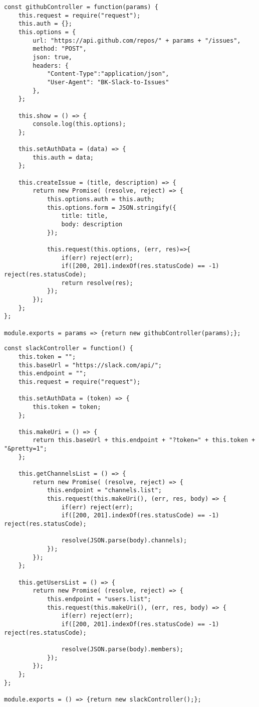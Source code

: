 \begin{verbatim}
const githubController = function(params) {
	this.request = require("request");
	this.auth = {};
	this.options = {
		url: "https://api.github.com/repos/" + params + "/issues",
		method: "POST",
		json: true,
		headers: {
			"Content-Type":"application/json",
			"User-Agent": "BK-Slack-to-Issues"
		},
	};

	this.show = () => {
		console.log(this.options);
	};

	this.setAuthData = (data) => {
		this.auth = data;
	};

	this.createIssue = (title, description) => {
		return new Promise( (resolve, reject) => {
			this.options.auth = this.auth;
			this.options.form = JSON.stringify({
				title: title,
				body: description
			});

			this.request(this.options, (err, res)=>{
				if(err) reject(err);
				if([200, 201].indexOf(res.statusCode) == -1) reject(res.statusCode);
				return resolve(res);
			});
		});
	};
};

module.exports = params => {return new githubController(params);};

\end{verbatim}

\begin{verbatim}
const slackController = function() {
	this.token = "";
	this.baseUrl = "https://slack.com/api/";
	this.endpoint = "";
	this.request = require("request");

	this.setAuthData = (token) => {
		this.token = token;
	};

	this.makeUri = () => {
		return this.baseUrl + this.endpoint + "?token=" + this.token + "&pretty=1";
	};

	this.getChannelsList = () => {
		return new Promise( (resolve, reject) => {
			this.endpoint = "channels.list";
			this.request(this.makeUri(), (err, res, body) => {
				if(err) reject(err);
				if([200, 201].indexOf(res.statusCode) == -1) reject(res.statusCode);

				resolve(JSON.parse(body).channels);
			});
		});
	};

	this.getUsersList = () => {
		return new Promise( (resolve, reject) => {
			this.endpoint = "users.list";
			this.request(this.makeUri(), (err, res, body) => {
				if(err) reject(err);
				if([200, 201].indexOf(res.statusCode) == -1) reject(res.statusCode);

				resolve(JSON.parse(body).members);
			});
		});
	};
};

module.exports = () => {return new slackController();};

\end{verbatim}


